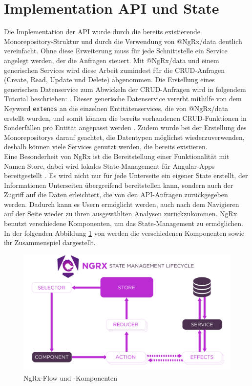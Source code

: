 \section{Implementation API und State}
Die Implementation der API wurde durch die bereits existierende Monorepository-Struktur und durch die Verwendung von @NgRx/data \cite{NgRx.io.2024} deutlich vereinfacht. Ohne diese Erweiterung muss für jede Schnittstelle ein Service angelegt werden, der die Anfragen steuert. Mit @NgRx/data und einem generischen Services wird diese Arbeit zumindest für die CRUD-Anfragen (Create, Read, Update und Delete) abgenommen. Die Erstellung eines generischen Datenservice zum Abwickeln der CRUD-Anfragen wird in folgendem Tutorial beschrieben: \cite{A.Waris.2023}.
Dieser generische Datenservice vererbt mithilfe von dem Keyword \texttt{extends} an die einzelnen Entitätenservices, die von @NgRx/data erstellt wurden, und somit können die bereits vorhandenen CRUD-Funktionen in Sonderfällen pro Entität angepasst werden \cite{MicrosoftTypeScript.2024}.  
Zudem wurde bei der Erstellung des Monorepositorys darauf geachtet, die Datentypen möglichst wiederzuverwenden, deshalb können viele Services genutzt werden, die bereits existieren.\\
Eine Besonderheit von NgRx ist die Bereitstellung einer Funktionalität mit Namen Store, dabei wird lokales State-Management für Angular-Apps bereitgestellt \cite{NgRx.io.2024b}. Es wird nicht nur für jede Unterseite ein eigener State erstellt, der Informationen Unterseiten übergreifend bereitstellen kann, sondern auch der Zugriff auf die Daten erleichtert, die von den API-Anfragen zurückgegeben werden. Dadurch kann es Usern ermöglicht werden, auch nach dem Navigieren auf der Seite wieder zu ihren ausgewählten Analysen zurückzukommen. NgRx benutzt verschiedene Komponenten, um das State-Management zu ermöglichen. In der folgenden Abbildung \ref{fig:NgRx} von \cite{NgRx.io.2024b} werden die verschiedenen Komponenten sowie ihr Zusammenspiel dargestellt.
\begin{figure}[!h]
    \centering
    \includegraphics[width=0.75\linewidth]{gfx/NgRx.png}
    \caption{NgRx-Flow und -Komponenten \cite{NgRx.io.2024b}}
    \label{fig:NgRx}
\end{figure}
